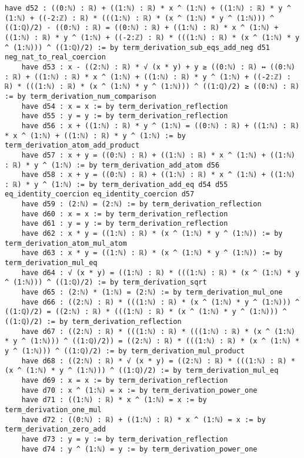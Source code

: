 \documentclass{article}
\begin{document}
\begin{tcolorbox}[colback=white!10, width=\linewidth]
\begin{lstlisting}[language=Lean4]
    have d52 : ((0:ℕ) : ℝ) + ((1:ℕ) : ℝ) * x ^ (1:ℕ) + ((1:ℕ) : ℝ) * y ^ (1:ℕ) + ((-2:ℤ) : ℝ) * (((1:ℕ) : ℝ) * (x ^ (1:ℕ) * y ^ (1:ℕ))) ^ ((1:ℚ)/2) - ((0:ℕ) : ℝ) = ((0:ℕ) : ℝ) + ((1:ℕ) : ℝ) * x ^ (1:ℕ) + ((1:ℕ) : ℝ) * y ^ (1:ℕ) + ((-2:ℤ) : ℝ) * (((1:ℕ) : ℝ) * (x ^ (1:ℕ) * y ^ (1:ℕ))) ^ ((1:ℚ)/2) := by term_derivation_sub_eqs_add_neg d51 neg_nat_to_real_coercion
    have d53 : x - ((2:ℕ) : ℝ) * √ (x * y) + y ≥ ((0:ℕ) : ℝ) ↔ ((0:ℕ) : ℝ) + ((1:ℕ) : ℝ) * x ^ (1:ℕ) + ((1:ℕ) : ℝ) * y ^ (1:ℕ) + ((-2:ℤ) : ℝ) * (((1:ℕ) : ℝ) * (x ^ (1:ℕ) * y ^ (1:ℕ))) ^ ((1:ℚ)/2) ≥ ((0:ℕ) : ℝ) := by term_derivation_num_comparison
    have d54 : x = x := by term_derivation_reflection
    have d55 : y = y := by term_derivation_reflection
    have d56 : x + ((1:ℕ) : ℝ) * y ^ (1:ℕ) = ((0:ℕ) : ℝ) + ((1:ℕ) : ℝ) * x ^ (1:ℕ) + ((1:ℕ) : ℝ) * y ^ (1:ℕ) := by term_derivation_atom_add_product
    have d57 : x + y = ((0:ℕ) : ℝ) + ((1:ℕ) : ℝ) * x ^ (1:ℕ) + ((1:ℕ) : ℝ) * y ^ (1:ℕ) := by term_derivation_add_atom d56
    have d58 : x + y = ((0:ℕ) : ℝ) + ((1:ℕ) : ℝ) * x ^ (1:ℕ) + ((1:ℕ) : ℝ) * y ^ (1:ℕ) := by term_derivation_add_eq d54 d55 eq_identity_coercion eq_identity_coercion d57
    have d59 : (2:ℕ) = (2:ℕ) := by term_derivation_reflection
    have d60 : x = x := by term_derivation_reflection
    have d61 : y = y := by term_derivation_reflection
    have d62 : x * y = ((1:ℕ) : ℝ) * (x ^ (1:ℕ) * y ^ (1:ℕ)) := by term_derivation_atom_mul_atom
    have d63 : x * y = ((1:ℕ) : ℝ) * (x ^ (1:ℕ) * y ^ (1:ℕ)) := by term_derivation_mul_eq
    have d64 : √ (x * y) = ((1:ℕ) : ℝ) * (((1:ℕ) : ℝ) * (x ^ (1:ℕ) * y ^ (1:ℕ))) ^ ((1:ℚ)/2) := by term_derivation_sqrt
    have d65 : (2:ℕ) * (1:ℕ) = (2:ℕ) := by term_derivation_mul_one
    have d66 : ((2:ℕ) : ℝ) * (((1:ℕ) : ℝ) * (x ^ (1:ℕ) * y ^ (1:ℕ))) ^ ((1:ℚ)/2) = ((2:ℕ) : ℝ) * (((1:ℕ) : ℝ) * (x ^ (1:ℕ) * y ^ (1:ℕ))) ^ ((1:ℚ)/2) := by term_derivation_reflection
    have d67 : ((2:ℕ) : ℝ) * (((1:ℕ) : ℝ) * (((1:ℕ) : ℝ) * (x ^ (1:ℕ) * y ^ (1:ℕ))) ^ ((1:ℚ)/2)) = ((2:ℕ) : ℝ) * (((1:ℕ) : ℝ) * (x ^ (1:ℕ) * y ^ (1:ℕ))) ^ ((1:ℚ)/2) := by term_derivation_mul_product
    have d68 : ((2:ℕ) : ℝ) * √ (x * y) = ((2:ℕ) : ℝ) * (((1:ℕ) : ℝ) * (x ^ (1:ℕ) * y ^ (1:ℕ))) ^ ((1:ℚ)/2) := by term_derivation_mul_eq
    have d69 : x = x := by term_derivation_reflection
    have d70 : x ^ (1:ℕ) = x := by term_derivation_power_one
    have d71 : ((1:ℕ) : ℝ) * x ^ (1:ℕ) = x := by term_derivation_one_mul
    have d72 : ((0:ℕ) : ℝ) + ((1:ℕ) : ℝ) * x ^ (1:ℕ) = x := by term_derivation_zero_add
    have d73 : y = y := by term_derivation_reflection
    have d74 : y ^ (1:ℕ) = y := by term_derivation_power_one

\end{lstlisting}
\end{tcolorbox}
\end{document}
